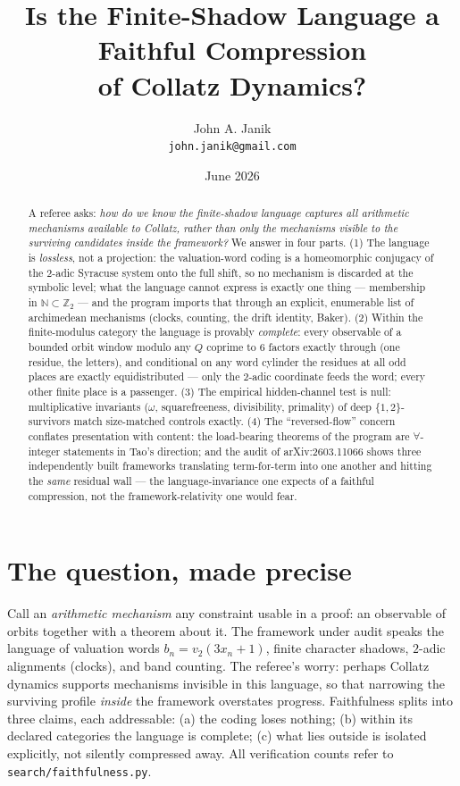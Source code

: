 \documentclass[11pt]{article}
\title{Is the Finite-Shadow Language a Faithful Compression\\ of Collatz
Dynamics?}
\author{John A. Janik\\ \small\texttt{john.janik@gmail.com}}
\date{June 2026}
\newcommand{\vt}{v_2}
\newcommand{\Ztwo}{\mathbb Z_2}
\begin{document}
\maketitle

\begin{abstract}
A referee asks: \emph{how do we know the finite-shadow language
captures all arithmetic mechanisms available to Collatz, rather than
only the mechanisms visible to the surviving candidates inside the
framework?} We answer in four parts. (1) The language is
\emph{lossless}, not a projection: the valuation-word coding is a
homeomorphic conjugacy of the $2$-adic Syracuse system onto the full
shift, so no mechanism is discarded at the symbolic level; what the
language cannot express is exactly one thing --- membership in
$\mathbb N\subset\Ztwo$ --- and the program imports that through an
explicit, enumerable list of archimedean mechanisms (clocks, counting,
the drift identity, Baker). (2) Within the finite-modulus category the
language is provably \emph{complete}: every observable of a bounded
orbit window modulo any $Q$ coprime to $6$ factors exactly through
(one residue, the letters), and conditional on any word cylinder the
residues at all odd places are exactly equidistributed --- only the
$2$-adic coordinate feeds the word; every other finite place is a
passenger. (3) The empirical hidden-channel test is null:
multiplicative invariants ($\omega$, squarefreeness, divisibility,
primality) of deep $\{1,2\}$-survivors match size-matched controls
exactly. (4) The ``reversed-flow'' concern conflates presentation with
content: the load-bearing theorems of the program are
$\forall$-integer statements in Tao's direction; and the audit of
arXiv:2603.11066 shows three independently built frameworks
translating term-for-term into one another and hitting the
\emph{same} residual wall --- the language-invariance one expects of a
faithful compression, not the framework-relativity one would fear.
\end{abstract}

\section{The question, made precise}

Call an \emph{arithmetic mechanism} any constraint usable in a proof:
an observable of orbits together with a theorem about it. The
framework under audit speaks the language of valuation words
$b_n=\vt(3x_n+1)$, finite character shadows, $2$-adic alignments
(clocks), and band counting. The referee's worry: perhaps Collatz
dynamics supports mechanisms invisible in this language, so that
narrowing the surviving profile \emph{inside} the framework
overstates progress. Faithfulness splits into three claims, each
addressable: (a) the coding loses nothing; (b) within its declared
categories the language is complete; (c) what lies outside is
isolated explicitly, not silently compressed away. All verification
counts refer to \texttt{search/faithfulness.py}.
\end{document}
